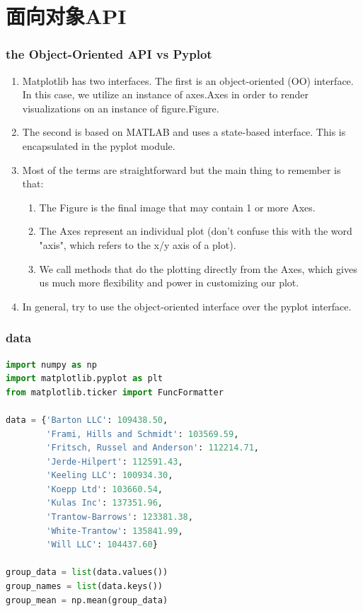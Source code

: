 \documentclass[UTF8,a4paper,12pt]{ctexart}  %
\providecommand{\tightlist}{\setlength{\itemsep}{0pt}\setlength{\parskip}{0pt}}
\begin{document}
\hypertarget{ux9762ux5411ux5bf9ux8c61api}{%
\section{面向对象API}\label{ux9762ux5411ux5bf9ux8c61api}}

\hypertarget{the-object-oriented-api-vs-pyplot}{%
\subsubsection{the Object-Oriented API vs Pyplot}\label{the-object-oriented-api-vs-pyplot}}

\begin{enumerate}
\def\labelenumi{\arabic{enumi}.}
\tightlist
\item
  Matplotlib has two interfaces. The first is an object-oriented (OO)
  interface. In this case, we utilize an instance of axes.Axes in
  order to render visualizations on an instance of figure.Figure.
\item
  The second is based on MATLAB and uses a state-based interface. This
  is encapsulated in the pyplot module.
\item
  Most of the terms are straightforward but the main thing to remember
  is that:

  \begin{enumerate}
  \def\labelenumii{\arabic{enumii}.}
  \tightlist
  \item
    The Figure is the final image that may contain 1 or more Axes.
  \item
    The Axes represent an individual plot (don't confuse this with
    the word "axis", which refers to the x/y axis of a plot).
  \item
    We call methods that do the plotting directly from the Axes,
    which gives us much more flexibility and power in customizing
    our plot.
  \end{enumerate}
\item
  In general, try to use the object-oriented interface over the pyplot
  interface.
\end{enumerate}

\hypertarget{data}{%
\subsubsection{data}\label{data}}

\begin{lstlisting}[language=Python]
import numpy as np
import matplotlib.pyplot as plt
from matplotlib.ticker import FuncFormatter

data = {'Barton LLC': 109438.50,
        'Frami, Hills and Schmidt': 103569.59,
        'Fritsch, Russel and Anderson': 112214.71,
        'Jerde-Hilpert': 112591.43,
        'Keeling LLC': 100934.30,
        'Koepp Ltd': 103660.54,
        'Kulas Inc': 137351.96,
        'Trantow-Barrows': 123381.38,
        'White-Trantow': 135841.99,
        'Will LLC': 104437.60}

group_data = list(data.values())
group_names = list(data.keys())
group_mean = np.mean(group_data)
\end{lstlisting}
\end{document}
